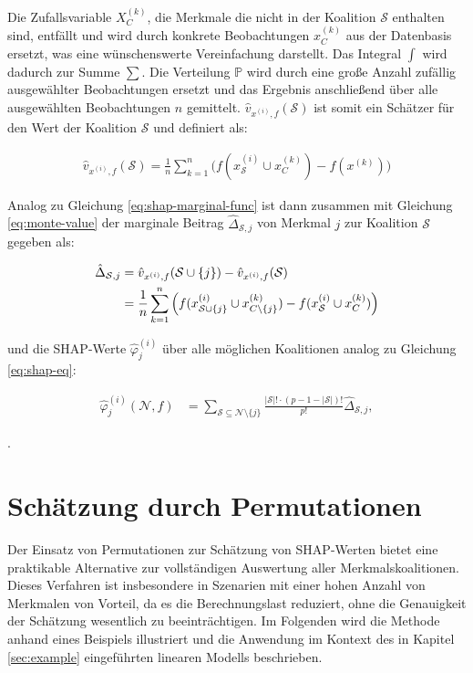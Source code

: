 Die Zufallsvariable $X_{C}^{(k)}$, die Merkmale die nicht in der Koalition $\mathcal{S}$ enthalten sind, 
entfällt und wird durch konkrete Beobachtungen $x_{C}^{(k)}$ aus der Datenbasis ersetzt, 
was eine wünschenswerte Vereinfachung darstellt. Das Integral $\int$ wird dadurch zur Summe $\sum$. Die Verteilung $\mathbb{P}$ wird durch eine große Anzahl zufällig 
ausgewählter Beobachtungen ersetzt und das Ergebnis anschließend über alle ausgewählten Beobachtungen $n$ gemittelt. 
$\hat{v}_{x^{(i)}, f}(\mathcal{S})$ ist somit ein Schätzer für den Wert der Koalition $\mathcal{S}$ und definiert als: 

\begin{align}
    \label{eq:monte-value}
    \hat{v}_{x^{(i)},f}(\mathcal{S}) = \frac{1}{n} \sum_{k=1}^{n} \Big(f(x^{(i)}_{\mathcal{S}} \cup x^{(k)}_{C}) - f(x^{(k)}) \Big)
\end{align}

Analog zu Gleichung \ref{eq:shap-marginal-func} ist dann zusammen mit Gleichung \ref{eq:monte-value} der marginale Beitrag 
$\hat{\Delta}_{\mathcal{S}, j}$ von Merkmal $j$ zur Koalition $\mathcal{S}$ gegeben als: 

\begin{align}
    \label{eq:monte-mar}
    \hat{\Delta}_{\mathcal{S}, j} &= \hat{v}_{x^{(i)},f}(\mathcal{S} \cup \{j\}) - \hat{v}_{x^{(i)},f}(\mathcal{S}) \\ \notag
        &= \frac{1}{n} \sum_{k=1}^{n} \Big(f(x^{(i)}_{\mathcal{S} \cup \{j\}} \cup x^{(k)}_{C \setminus \{j\}}) - f(x^{(i)}_{\mathcal{S}} \cup x^{(k)}_{C}) \Big)
\end{align}

und die SHAP-Werte $\hat{\varphi}_{j}^{(i)}$ über alle möglichen Koalitionen analog zu Gleichung \ref{eq:shap-eq}:

\begin{align}
    \label{eq:monte-shap-eq}
    \hat{\varphi}^{(i)}_{j} (\mathcal{N}, f) &= \sum_{\mathcal{S} \subseteq \mathcal{N} \setminus \{j\}} \frac{|\mathcal{S}|! \cdot (p - 1 - |\mathcal{S}|)!}{p!}\hat{\Delta}_{\mathcal{S}, j},
\end{align}

\cite[S.36]{Molnar_2023}.

\section{Schätzung durch Permutationen}
\label{subsec:permutation}

Der Einsatz von Permutationen zur Schätzung von SHAP-Werten bietet eine 
praktikable Alternative zur vollständigen Auswertung aller Merkmalskoalitionen. 
Dieses Verfahren ist insbesondere in Szenarien mit einer hohen Anzahl von Merkmalen von Vorteil, 
da es die Berechnungslast reduziert, ohne die Genauigkeit der Schätzung wesentlich zu beeinträchtigen. 
Im Folgenden wird die Methode anhand eines Beispiels illustriert und die Anwendung im Kontext des in 
Kapitel \ref{sec:example} eingeführten linearen Modells beschrieben.

